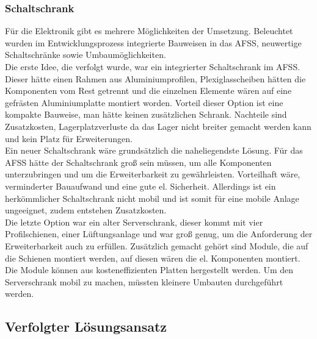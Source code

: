 \subsubsection{Schaltschrank}
Für die Elektronik gibt es mehrere Möglichkeiten der Umsetzung. Beleuchtet wurden im Entwicklungsprozess integrierte Bauweisen in das AFSS, neuwertige Schaltschränke sowie Umbaumöglichkeiten.\\
Die erste Idee, die verfolgt wurde, war ein integrierter Schaltschrank im AFSS. Dieser hätte einen Rahmen aus Aluminiumprofilen, Plexiglasscheiben hätten die Komponenten vom Rest getrennt und die einzelnen Elemente wären auf eine gefrästen Aluminiumplatte montiert worden. Vorteil dieser Option ist eine kompakte Bauweise, man hätte keinen zusätzlichen Schrank. Nachteile sind Zusatzkosten, Lagerplatzverluste da das Lager nicht breiter gemacht werden kann und kein Platz für Erweiterungen.\\
Ein neuer Schaltschrank wäre grundsätzlich die naheliegendste  Lösung. Für das AFSS hätte der Schaltschrank groß sein müssen, um alle Komponenten unterzubringen und um die Erweiterbarkeit zu gewährleisten. Vorteilhaft wäre, verminderter Bauaufwand und eine gute el. Sicherheit. Allerdings ist ein herkömmlicher Schaltschrank nicht mobil und ist somit für eine mobile Anlage ungeeignet, zudem entstehen Zusatzkosten.\\	
Die letzte Option war ein alter Serverschrank, dieser kommt mit vier Profilschienen, einer Lüftungsanlage und war groß genug, um die Anforderung der Erweiterbarkeit auch zu erfüllen. Zusätzlich gemacht gehört sind Module, die auf die Schienen montiert werden, auf diesen wären die el. Komponenten montiert. Die Module können aus kosteneffizienten Platten hergestellt werden. Um den Serverschrank mobil zu machen, müssten kleinere Umbauten durchgeführt werden.


\subsection{Verfolgter Lösungsansatz}

